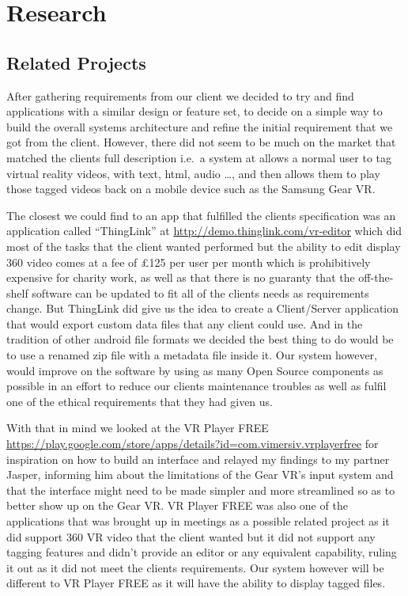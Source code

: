 \documentclass[12pt]{report}
\begin{document}
\tableofcontents
\chapter{Research}
\section{Related Projects}

After gathering requirements from our client we decided to try and find
applications with a similar design or feature set, to decide on a simple way to
build the overall systems architecture and refine the initial requirement that
we got from the client. However, there did not seem to be much on the market
that matched the clients full description i.e.\ a system at allows a normal
user to tag virtual reality videos, with text, html, audio \ldots, and then
allows them to play those tagged videos back on a mobile device such as the
Samsung Gear VR\@. 

The closest we could find to an app that fulfilled the clients specification was
an application called ``ThingLink'' at
\url{http://demo.thinglink.com/vr-editor} which did most of the tasks that the
client wanted performed but the ability to edit display 360 video comes at a fee of
£125 per user per month which is prohibitively expensive for charity work, as
well as that there is no guaranty that the off-the-shelf software can be
updated to fit all of the clients needs as requirements change. But ThingLink
did give us the idea to create a Client/Server application that would export
custom data files that any client could use. And in the tradition of other
android file formats we decided the best thing to do would be to use a renamed
zip file with a metadata file inside it. Our system however, would improve on
the software by using as many Open Source components as possible in an effort
to reduce our clients maintenance troubles as well as fulfil one of the ethical
requirements that they had given us. 

With that in mind we looked at the VR Player FREE
\url{https://play.google.com/store/apps/details?id=com.vimersiv.vrplayerfree}
for inspiration on how to build an interface and relayed my findings to my
partner Jasper, informing him about the limitations of the Gear VR's input
system and that the interface might need to be made simpler and more
streamlined so as to better show up on the Gear VR\@. VR Player FREE was also
one of the applications that was brought up in meetings as a possible related
project as it did support 360 VR video that the client wanted but it did not
support any tagging features and didn't provide an editor or any equivalent
capability, ruling it out as it did not meet the clients requirements. Our
system however will be different to VR Player FREE as it will have the ability
to display tagged files.
\end{document}
